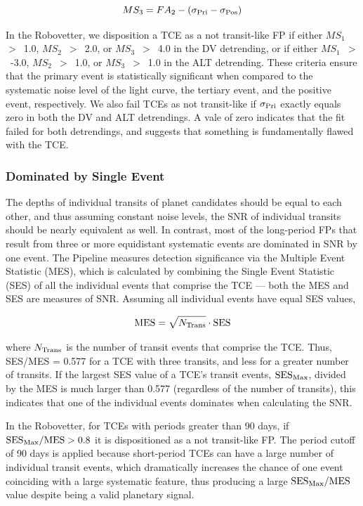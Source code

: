 \begin{equation}
    MS_{3} = FA_{2} - (\sigma_{\rm Pri} - \sigma_{\rm Pos})
\end{equation}

In the Robovetter, we disposition a TCE as a not transit-like FP if either $MS_{1}$~$>$~1.0, $MS_{2}$~$>$~2.0, or $MS_{3}$~$>$~4.0 in the DV detrending, or if either $MS_{1}$~$>$~-3.0, $MS_{2}$~$>$~1.0, or $MS_{3}$~$>$~1.0 in the ALT detrending. These criteria ensure that the primary event is statistically significant when compared to the systematic noise level of the light curve, the tertiary event, and the positive event, respectively. We also fail TCEs as not transit-like if $\sigma_{\rm Pri}$ exactly equals zero in both the DV and ALT detrendings. A vale of zero indicates that the fit failed for both detrendings, and suggests that something is fundamentally flawed with the TCE.


\subsubsection{Dominated by Single Event}
\label{s:sesmes}

The depths of individual transits of planet candidates should be equal to each other, and thus assuming constant noise levels, the SNR of individual transits should be nearly equivalent as well. In contrast, most of the long-period FPs that result from three or more equidistant systematic events are dominated in SNR by one event. The \kepler{} Pipeline measures detection significance via the Multiple Event Statistic (MES), which is calculated by combining the Single Event Statistic (SES) of all the individual events that comprise the TCE --- both the MES and SES are measures of SNR. Assuming all individual events have equal SES values,

\begin{equation}
{\rm MES} = \sqrt{N_{\rm Trans}} \cdot {\rm SES}
\end{equation}

\noindent where $N_{\rm Trans}$ is the number of transit events that comprise the TCE. Thus, SES/MES = 0.577 for a TCE with three transits, and less for a greater number of transits. If the largest SES value of a TCE's transit events, ${\rm SES}_{\rm Max}$, divided by the MES is much larger than 0.577 (regardless of the number of transits), this indicates that one of the individual events dominates when calculating the SNR.

In the Robovetter, for TCEs with periods greater than 90 days, if ${{\rm SES}_{\rm Max} / {\rm MES} > 0.8}$ it is dispositioned as a not transit-like FP. The period cutoff of 90 days is applied because short-period TCEs can have a large number of individual transit events, which dramatically increases the chance of one event coinciding with a large systematic feature, thus producing a large ${{\rm SES}_{\rm Max} / {\rm MES}}$ value despite being a valid planetary signal.

